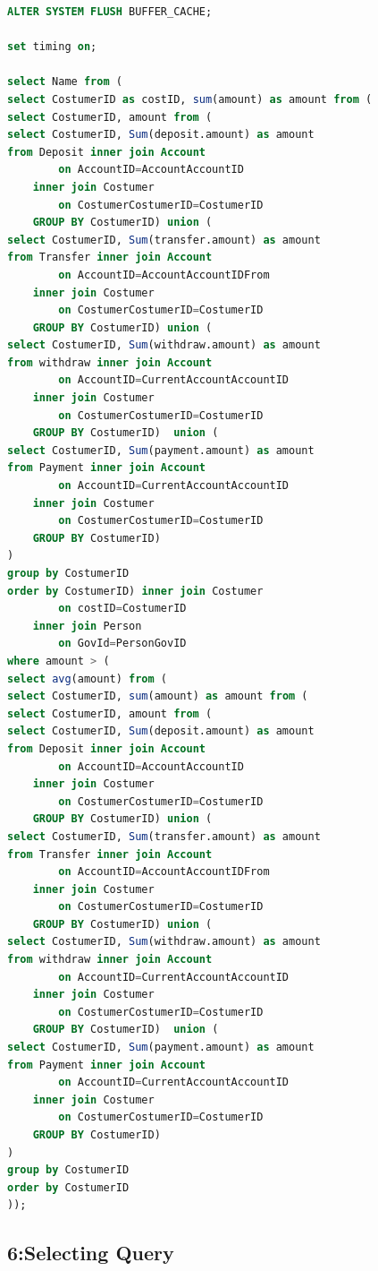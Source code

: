 \documentclass[a4paper, 10pt]{article}
\begin{document}
\begin{lstlisting}[language=SQL]
ALTER SYSTEM FLUSH BUFFER_CACHE;

set timing on;

select Name from (
select CostumerID as costID, sum(amount) as amount from (
select CostumerID, amount from (
select CostumerID, Sum(deposit.amount) as amount
from Deposit inner join Account 
        on AccountID=AccountAccountID 
    inner join Costumer 
        on CostumerCostumerID=CostumerID
    GROUP BY CostumerID) union (
select CostumerID, Sum(transfer.amount) as amount
from Transfer inner join Account 
        on AccountID=AccountAccountIDFrom 
    inner join Costumer 
        on CostumerCostumerID=CostumerID
    GROUP BY CostumerID) union (
select CostumerID, Sum(withdraw.amount) as amount
from withdraw inner join Account 
        on AccountID=CurrentAccountAccountID 
    inner join Costumer 
        on CostumerCostumerID=CostumerID
    GROUP BY CostumerID)  union (   
select CostumerID, Sum(payment.amount) as amount
from Payment inner join Account 
        on AccountID=CurrentAccountAccountID 
    inner join Costumer 
        on CostumerCostumerID=CostumerID
    GROUP BY CostumerID)
)
group by CostumerID
order by CostumerID) inner join Costumer 
        on costID=CostumerID 
    inner join Person 
        on GovId=PersonGovID
where amount > (
select avg(amount) from (
select CostumerID, sum(amount) as amount from (
select CostumerID, amount from (
select CostumerID, Sum(deposit.amount) as amount
from Deposit inner join Account 
        on AccountID=AccountAccountID 
    inner join Costumer 
        on CostumerCostumerID=CostumerID
    GROUP BY CostumerID) union (
select CostumerID, Sum(transfer.amount) as amount
from Transfer inner join Account 
        on AccountID=AccountAccountIDFrom 
    inner join Costumer 
        on CostumerCostumerID=CostumerID
    GROUP BY CostumerID) union (
select CostumerID, Sum(withdraw.amount) as amount
from withdraw inner join Account 
        on AccountID=CurrentAccountAccountID 
    inner join Costumer 
        on CostumerCostumerID=CostumerID
    GROUP BY CostumerID)  union (   
select CostumerID, Sum(payment.amount) as amount
from Payment inner join Account 
        on AccountID=CurrentAccountAccountID 
    inner join Costumer 
        on CostumerCostumerID=CostumerID
    GROUP BY CostumerID)
)
group by CostumerID
order by CostumerID
));
\end{lstlisting}

\subsection{6:Selecting Query}
\end{document}
